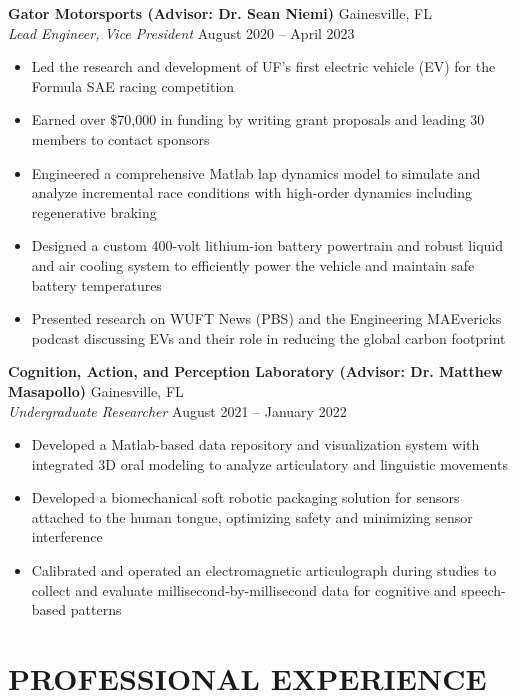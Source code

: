\documentclass[10pt]{article}
\begin{document}
\textbf{Gator Motorsports (Advisor: Dr. Sean Niemi)} \hfill Gainesville, FL \\
\textit{Lead Engineer, Vice President } \hfill August 2020 -- April 2023
\begin{itemize}[left=0em, itemsep=0.3em] %
    \footnotesize
    \fontsize{10pt}{11pt}\selectfont 
    \item Led the research and development of UF's first electric vehicle (EV) for the Formula SAE racing competition
    \item Earned over \$70,000 in funding by writing grant proposals and leading 30 members to contact sponsors
    \item Engineered a comprehensive Matlab lap dynamics model to simulate and analyze incremental race conditions with high-order dynamics including regenerative braking
    \item Designed a custom 400-volt lithium-ion battery powertrain and robust liquid and air cooling system to efficiently power the vehicle and maintain safe battery temperatures
    \item Presented research on WUFT News (PBS) and the Engineering MAEvericks podcast discussing EVs and their role in reducing the global carbon footprint
\end{itemize}
\textbf{Cognition, Action, and Perception Laboratory (Advisor: Dr. Matthew Masapollo)} \hfill Gainesville, FL \\
\textit{Undergraduate Researcher} \hfill August 2021 -- January 2022
\begin{itemize}[left=0em, itemsep=0.3em] %
    \footnotesize
    \fontsize{10pt}{11pt}\selectfont 
    \item Developed a Matlab-based data repository and visualization system with integrated 3D oral modeling to analyze articulatory and linguistic movements
    \item Developed a biomechanical soft robotic packaging solution for sensors attached to the human tongue, optimizing safety and minimizing sensor interference
    \item Calibrated and operated an electromagnetic articulograph during studies to collect and evaluate millisecond-by-millisecond data for cognitive and speech-based patterns
\end{itemize}

\section*{PROFESSIONAL EXPERIENCE}
\end{document}

